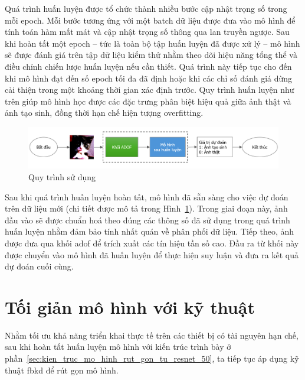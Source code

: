 Quá trình huấn luyện được tổ chức thành nhiều bước cập nhật trọng số trong mỗi \gls{epoch}. Mỗi bước tương ứng với một \gls{batch} dữ liệu được đưa vào mô hình để tính toán hàm mất mát và cập nhật trọng số thông qua lan truyền ngược. Sau khi hoàn tất một \gls{epoch} – tức là toàn bộ tập huấn luyện đã được xử lý – mô hình sẽ được đánh giá trên tập dữ liệu kiểm thử nhằm theo dõi hiệu năng tổng thể và điều chỉnh chiến lược huấn luyện nếu cần thiết. Quá trình này tiếp tục cho đến khi mô hình đạt đến số \gls{epoch} tối đa đã định hoặc khi các chỉ số đánh giá dừng cải thiện trong một khoảng thời gian xác định trước. Quy trình huấn luyện như trên giúp mô hình học được các đặc trưng phân biệt hiệu quả giữa ảnh thật và ảnh tạo sinh, đồng thời hạn chế hiện tượng \gls{overfitting}.
%
%
\begin{figure}[ht!]
	\centering
	\includegraphics[width=1.0\linewidth]{Images/online-serving.png}
	\begin{minipage}{1.0\linewidth}
		\vspace{3mm}
		\caption{Quy trình sử dụng}
		\label{fig:online-serving}
	\end{minipage}
\end{figure}
%
%

Sau khi quá trình huấn luyện hoàn tất, mô hình đã sẵn sàng cho việc dự đoán trên dữ liệu mới (chi tiết được mô tả trong Hình~\ref{fig:online-serving}). Trong giai đoạn này, ảnh đầu vào sẽ được chuẩn hoá theo đúng các thông số đã sử dụng trong quá trình huấn luyện nhằm đảm bảo tính nhất quán về phân phối dữ liệu. Tiếp theo, ảnh được đưa qua khối \gls{adof} để trích xuất các tín hiệu tần số cao. Đầu ra từ khối này được chuyển vào mô hình đã huấn luyện để thực hiện suy luận và đưa ra kết quả dự đoán cuối cùng.

\section{Tối giản mô hình với kỹ thuật }
%
\label{ss:toi_gian_mo_hinh}
%
Nhằm tối ưu khả năng triển khai thực tế trên các thiết bị có tài nguyên hạn chế, sau khi hoàn tất huấn luyện mô hình với kiến trúc trình bày ở phần~\ref{sec:kien_truc_mo_hinh_rut_gon_tu_resnet_50}, ta tiếp tục áp dụng kỹ thuật \gls{fbkd} để rút gọn mô hình.

